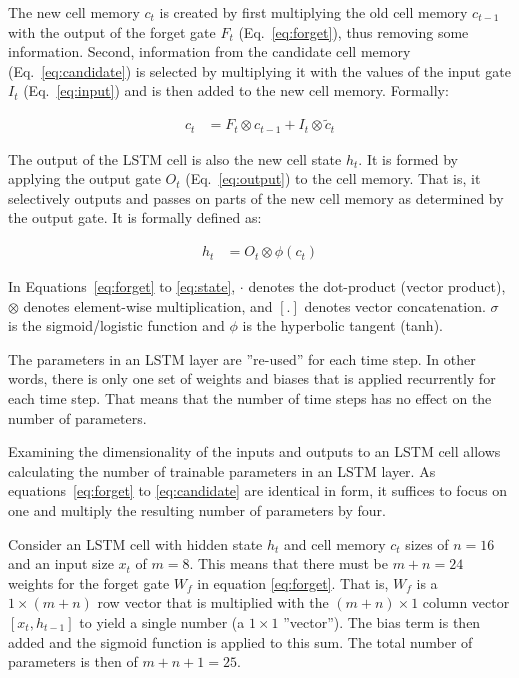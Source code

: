 The new cell memory $c_t$ is created by first multiplying the old cell memory $c_{t-1}$ with the output of the forget gate $F_t$ (Eq.~\ref{eq:forget}), thus removing some information. Second, information from the candidate cell memory (Eq.~\ref{eq:candidate}) is selected by multiplying it with the values of the input gate $I_t$ (Eq.~\ref{eq:input}) and is then added to the new cell memory. Formally:

\begin{align}
c_t &= F_t \otimes c_{t-1} + I_t \otimes \tilde{c}_t \label{eq:memory}
\end{align}

The output of the LSTM cell is also the new cell state $h_t$. It is formed by applying the output gate $O_t$ (Eq.~\ref{eq:output}) to the cell memory. That is, it selectively outputs and passes on parts of the new cell memory as determined by the output gate. It is formally defined as:

\begin{align}
h_t &= O_t \otimes \phi(c_t) \label{eq:state}
\end{align}

In Equations~\ref{eq:forget} to \ref{eq:state}, $\cdot$ denotes the dot-product (vector product), $\otimes$ denotes element-wise multiplication, and $[.]$ denotes vector concatenation. $\sigma$ is the sigmoid/logistic function and $\phi$ is the hyperbolic tangent (tanh).

The parameters in an LSTM layer are ''re-used'' for each time step. In other words, there is only one set of weights and biases that is applied recurrently for each time step. That means that the number of time steps has no effect on the number of parameters. 

Examining the dimensionality of the inputs and outputs to an LSTM cell allows calculating the number of trainable parameters in an LSTM layer. As equations~\ref{eq:forget} to \ref{eq:candidate} are identical in form, it suffices to focus on one and multiply the resulting number of parameters by four. 

Consider an LSTM cell with hidden state $h_t$ and cell memory $c_t$ sizes of $n=16$ and an input size $x_t$ of $m=8$. This means that there must be $m+n=24$ weights for the forget gate $W_f$ in equation \ref{eq:forget}. That is, $W_f$ is a $1 \times (m+n)$ row vector that is multiplied with the $(m+n) \times 1$ column vector $[x_t, h_{t-1}]$ to yield a single number (a $1 \times 1$ ''vector''). The bias term is then added and the sigmoid function is applied to this sum. The total number of parameters is then of $m+n+1=25$.


